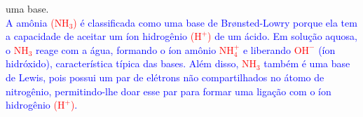 \documentclass[a4paper, 12pt]{article}
\begin{document}
\begin{enumerate}
\begin{enumerate}[align=left, labelsep=-0.5em]
                    uma base.
                    \\[10pt]
                    \textcolor{blue}{A amônia \textcolor{red}{(\(\text{NH}_3\))} é classificada como uma base de Brønsted-Lowry porque ela tem a capacidade de aceitar um íon hidrogênio \textcolor{red}{(\(\text{H}^+\))} de um ácido. Em solução aquosa, o \textcolor{red}{\(\text{NH}_3\)} reage com a água, formando o íon amônio \textcolor{red}{\(\text{NH}_4^+\)} e liberando \textcolor{red}{\(\text{OH}^-\)} (íon hidróxido), característica típica das bases. Além disso, \textcolor{red}{\(\text{NH}_3\)} também é uma base de Lewis, pois possui um par de elétrons não compartilhados no átomo de nitrogênio, permitindo-lhe doar esse par para formar uma ligação com o íon hidrogênio \textcolor{red}{(\(\text{H}^+\))}.}

          \end{enumerate}





\end{enumerate}
\end{document}
